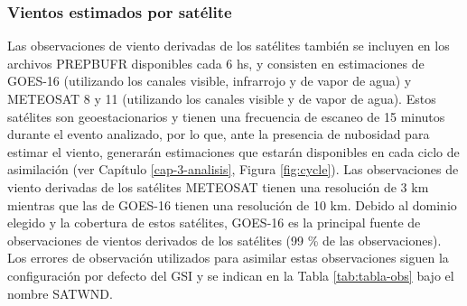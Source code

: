 \documentclass[12pt,oneside,a4paper]{reedthesis}
\begin{document}
\hypertarget{vientos-estimados-por-satuxe9lite}{%
\subsubsection{Vientos estimados por satélite}\label{vientos-estimados-por-satuxe9lite}}

Las observaciones de viento derivadas de los satélites también se incluyen en los archivos PREPBUFR disponibles cada 6 hs, y consisten en estimaciones de GOES-16 (utilizando los canales visible, infrarrojo y de vapor de agua) y METEOSAT 8 y 11 (utilizando los canales visible y de vapor de agua). Estos satélites son geoestacionarios y tienen una frecuencia de escaneo de 15 minutos durante el evento analizado, por lo que, ante la presencia de nubosidad para estimar el viento, generarán estimaciones que estarán disponibles en cada ciclo de asimilación (ver Capítulo \ref{cap-3-analisis}, Figura \ref{fig:cycle}). Las observaciones de viento derivadas de los satélites METEOSAT tienen una resolución de 3 km mientras que las de GOES-16 tienen una resolución de 10 km. Debido al dominio elegido y la cobertura de estos satélites, GOES-16 es la principal fuente de observaciones de vientos derivados de los satélites (99 \% de las observaciones). Los errores de observación utilizados para asimilar estas observaciones siguen la configuración por defecto del GSI y se indican en la Tabla \ref{tab:tabla-obs} bajo el nombre SATWND.
\end{document}
